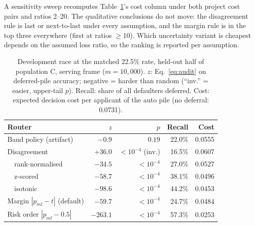 \documentclass[conference]{IEEEtran}
\begin{document}
A sensitivity sweep recomputes Table~\ref{tab:audit}'s cost column under
both project cost pairs and ratios 2--20. The qualitative conclusions do
not move: the disagreement rule is last or next-to-last under every
assumption, and the margin rule is in the top three everywhere (first at
ratios $\geq$10). Which uncertainty variant is cheapest depends on the
assumed loss ratio, so the ranking is reported per assumption.

\begin{table}[t]
\centering
\small
\caption{Development race at the matched 22.5\% rate, held-out half of
population C, serving frame ($m=10{,}000$). $z$: Eq.~\eqref{eq:audit} on
deferred-pile accuracy; negative = harder than random (``inv.'' = easier,
upper-tail $p$). Recall: share of all defaulters deferred. Cost: expected
decision cost per applicant of the auto pile (no deferral: 0.0731).}
\label{tab:audit}
\begin{tabular}{@{}l r r r r@{}}
\toprule
\textbf{Router} & \textbf{$z$} & \textbf{$p$} & \textbf{Recall} & \textbf{Cost} \\
\midrule
Band policy (artifact) & $-0.9$ & $0.19$ & 22.0\% & 0.0555 \\
Disagreement & $+36.0$ & $<10^{-4}$ (inv.) & 16.5\% & 0.0607 \\
\ \ rank-normalised & $-34.5$ & $<10^{-4}$ & 27.0\% & 0.0527 \\
\ \ z-scored & $-58.7$ & $<10^{-4}$ & 38.1\% & 0.0496 \\
\ \ isotonic & $-98.6$ & $<10^{-4}$ & 44.2\% & 0.0453 \\
Margin $|p_{ml}{-}t|$ (default) & $-59.7$ & $<10^{-4}$ & 24.7\% & 0.0484 \\
Risk order $|p_{ml}{-}0.5|$ & $-263.1$ & $<10^{-4}$ & 57.3\% & 0.0253 \\
\bottomrule
\end{tabular}
\end{table}
\end{document}

